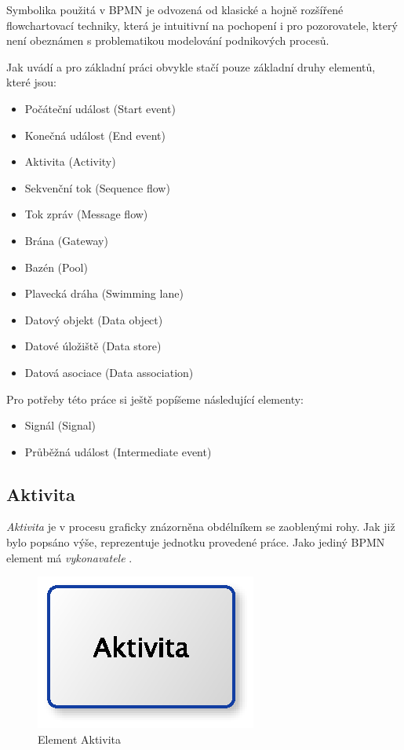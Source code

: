 \documentclass[]{article}
\begin{document}
Symbolika použitá v BPMN je odvozená od klasické a hojně rozšířené flowchartovací techniky, která je intuitivní na pochopení i pro pozorovatele, který není obeznámen s problematikou modelování podnikových procesů.

Jak uvádí \cite{Silver2011} a \cite{Vasicek2008} pro základní práci obvykle stačí pouze základní druhy elementů, které jsou:

\begin{itemize}
\item Počáteční událost (Start event)
\item Konečná událost (End event)
\item Aktivita (Activity)
\item Sekvenční tok (Sequence flow)
\item Tok zpráv (Message flow)
\item Brána (Gateway)
\item Bazén (Pool)
\item Plavecká dráha (Swimming lane)
\item Datový objekt (Data object)
\item Datové úložiště (Data store)
\item Datová asociace (Data association)
\end{itemize}

Pro potřeby této práce si ještě popíšeme následující elementy:

\begin{itemize}
\item Signál (Signal)
\item Průběžná událost (Intermediate event)
\end{itemize}

\subsection{Aktivita}
\textit{Aktivita} je v procesu graficky znázorněna obdélníkem se zaoblenými rohy. Jak již bylo popsáno výše, reprezentuje jednotku provedené práce. Jako jediný BPMN element má \textit{vykonavatele} \cite{Silver2011}. 

\begin{figure}[H]\centering
\includegraphics{obrazky/activity}
\caption{Element Aktivita}
\label{fig:aktivita}
\end{figure}
\end{document}
